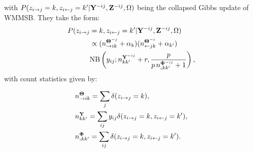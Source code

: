 %
with  $P(z_{i\rightarrow j}=k, z_{i\leftarrow j}=k' | {\mathbf{Y}}^{-ij}, {\mathbf{Z}}^{-ij}, \Omega)$ being the collapsed Gibbs update of WMMSB. They take the form:
%
\begin{align*}
P(z_{i\rightarrow j} & = k, z_{i\leftarrow j}=k' |{\mathbf{Y}}^{-ij}, {\mathbf{Z}}^{-ij}, \Omega) \\
& \propto (n_{\rightarrow ik}^{{\boldsymbol{\Theta}}^{-j}} + \alpha_k) (n_{\leftarrow jk}^{{\boldsymbol{\Theta}}^{-i}} + \alpha_{k'}) \\
& \mathrm{NB}\left(y_{ij}; n^{{\mathbf{Y}}^{-ij}}_{kk'} + r, \frac{p}{p\,n^{{\boldsymbol{\Phi}}^{-ij}}_{\bm{.}kk'} + 1} \right),
\end{align*}
%
with count statistics given by:


\begin{align*}                                                                                                                                        
&n^{{\boldsymbol{\Theta}}}_{\rightarrow ik} = \sum_j \delta(z_{i\rightarrow j}=k), \\
&n^{{\mathbf{Y}}}_{kk'} = \sum_{ij} y_{ij}\delta(z_{i\rightarrow j}=k, z_{i\leftarrow j}=k'), \\
&n^{{\boldsymbol{\Phi}}}_{\bm{.}kk'} = \sum_{ij} \delta( z_{i\rightarrow j}=k, z_{i\leftarrow j}=k').
\end{align*}   

